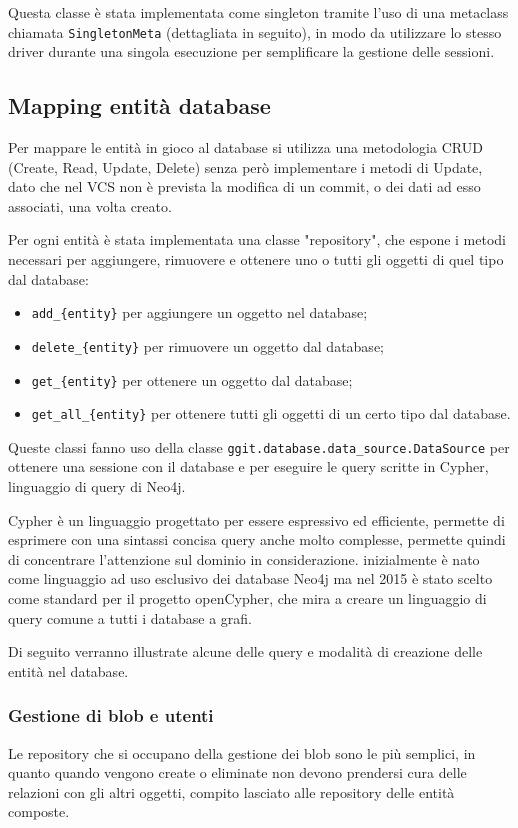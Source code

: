 Questa classe è stata implementata come singleton tramite l'uso di una metaclass chiamata \texttt{SingletonMeta} (dettagliata in seguito), in modo da utilizzare lo stesso driver durante una singola esecuzione per semplificare la gestione delle sessioni.

\subsection{Mapping entità database}
Per mappare le entità in gioco al database si utilizza una metodologia CRUD (Create, Read, Update, Delete) senza però implementare i metodi di Update, dato che nel VCS non è prevista la modifica di un commit, o dei dati ad esso associati, una volta creato.

Per ogni entità è stata implementata una classe "repository", che espone i metodi necessari per aggiungere, rimuovere e ottenere uno o tutti gli oggetti di quel tipo dal database:
\begin{itemize}
    \item \texttt{add\_\{entity\}} per aggiungere un oggetto nel database;
    \item \texttt{delete\_\{entity\}} per rimuovere un oggetto dal database;
    \item \texttt{get\_\{entity\}} per ottenere un oggetto dal database;
    \item \texttt{get\_all\_\{entity\}} per ottenere tutti gli oggetti di un certo tipo dal database.
\end{itemize}

Queste classi fanno uso della classe \texttt{ggit.database.data\_source.DataSource} per ottenere una sessione con il database e per eseguire le query scritte in Cypher, linguaggio di query di Neo4j.

Cypher è un linguaggio progettato per essere espressivo ed efficiente, permette di esprimere con una sintassi concisa query  anche molto complesse, permette quindi di concentrare l'attenzione sul dominio in considerazione.
inizialmente è nato come linguaggio ad uso esclusivo dei database Neo4j ma nel 2015 è stato scelto come standard per il progetto openCypher\cite{opencypher}, che mira a creare un linguaggio di query comune a tutti i database a grafi.

Di seguito verranno illustrate alcune delle query e modalità di creazione delle entità nel database.

\subsubsection{Gestione di blob e utenti}
Le repository che si occupano della gestione dei blob sono le più semplici, in quanto quando vengono create o eliminate non devono prendersi cura delle relazioni con gli altri oggetti, compito lasciato alle repository delle entità composte.


